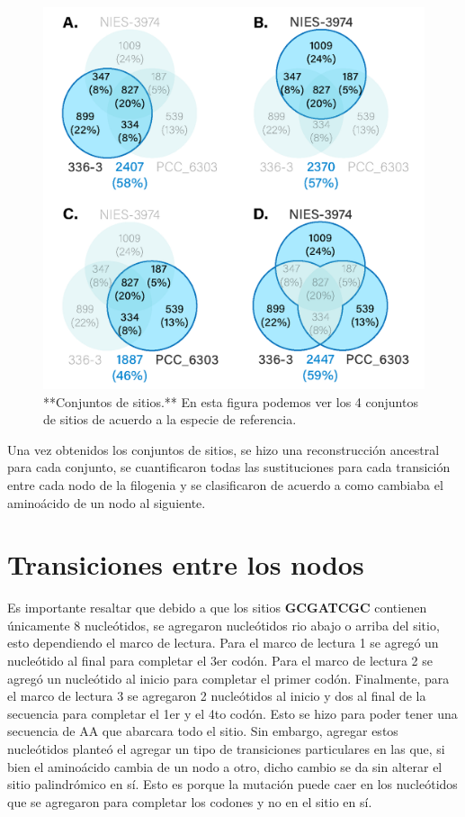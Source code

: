 \documentclass[
]{book}
\begin{document}
\begin{figure}

{\centering \includegraphics[width=0.8\linewidth]{Clados/Calothrix_B/figures/All_venn_calothrix} 

}

\caption{**Conjuntos de sitios.** En esta figura podemos ver los 4 conjuntos de sitios de acuerdo a la especie de referencia.}\label{fig:FIG3}
\end{figure}

Una vez obtenidos los conjuntos de sitios, se hizo una reconstrucción ancestral para cada conjunto, se cuantificaron todas las sustituciones para cada transición entre cada nodo de la filogenia y se clasificaron de acuerdo a como cambiaba el aminoácido de un nodo al siguiente.

\hypertarget{transiciones-entre-los-nodos}{%
\section{Transiciones entre los nodos}\label{transiciones-entre-los-nodos}}

Es importante resaltar que debido a que los sitios \textbf{GCGATCGC} contienen únicamente 8 nucleótidos, se agregaron nucleótidos rio abajo o arriba del sitio, esto dependiendo el marco de lectura. Para el marco de lectura 1 se agregó un nucleótido al final para completar el 3er codón. Para el marco de lectura 2 se agregó un nucleótido al inicio para completar el primer codón. Finalmente, para el marco de lectura 3 se agregaron 2 nucleótidos al inicio y dos al final de la secuencia para completar el 1er y el 4to codón. Esto se hizo para poder tener una secuencia de AA que abarcara todo el sitio. Sin embargo, agregar estos nucleótidos planteó el agregar un tipo de transiciones particulares en las que, si bien el aminoácido cambia de un nodo a otro, dicho cambio se da sin alterar el sitio palindrómico en sí. Esto es porque la mutación puede caer en los nucleótidos que se agregaron para completar los codones y no en el sitio en sí.
\end{document}
